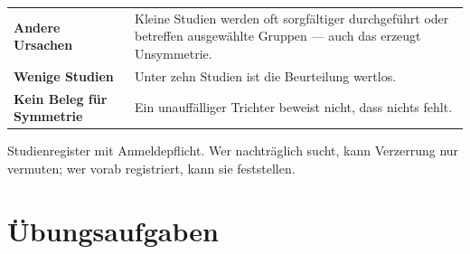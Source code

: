 \begin{warnung}
\begin{center}
\renewcommand{\arraystretch}{1.5}
\begin{tabular}{@{}P{2.6cm}P{6.0cm}@{}}
\toprule
\textbf{Andere Ursachen} & Kleine Studien werden oft sorgfältiger durchgeführt oder betreffen ausgewählte Gruppen --- auch das erzeugt Unsymmetrie.\\
\textbf{Wenige Studien} & Unter zehn Studien ist die Beurteilung wertlos.\\
\textbf{Kein Beleg für Symmetrie} & Ein unauffälliger Trichter beweist nicht, dass nichts fehlt.\\
\bottomrule
\end{tabular}
\end{center}

Studienregister mit Anmeldepflicht. Wer nachträglich sucht, kann Verzerrung nur vermuten; wer vorab registriert, kann sie feststellen.

\begin{center}
\begin{minipage}{0.88\textwidth}
\end{minipage}
\end{center}
\end{warnung}

\section{Übungsaufgaben}

